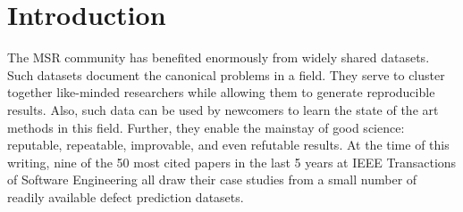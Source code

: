 \documentclass[sigconf]{acmart}
\begin{document}
%
%



\keywords{}



\maketitle
% 





\section{Introduction}


The MSR  community has benefited enormously from widely shared datasets.  Such datasets document the canonical problems in a field.
They serve to cluster together like-minded researchers while allowing them to generate reproducible results. Also, such data can be used by newcomers to learn the state of the art methods in this field. Further, they enable the mainstay of good science:
reputable, repeatable,  improvable, and even refutable results.
At the time of this writing,   nine of the 50 most cited papers in the last 5 years at IEEE Transactions of Software Engineering {all draw their case studies
from a small number of readily available defect prediction datasets.} 
\end{document}
